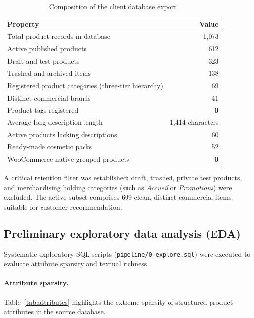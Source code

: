 \begin{table}[H]
\caption{Composition of the client database export}
\label{tab:catalogue}
\centering
\begin{tabularx}{\textwidth}{X r}
\toprule
\textbf{Property} & \textbf{Value} \\
\midrule
Total product records in database & 1{,}073 \\
Active published products & 612 \\
Draft and test products & 323 \\
Trashed and archived items & 138 \\
Registered product categories (three-tier hierarchy) & 69 \\
Distinct commercial brands & 41 \\
Product tags registered & \textbf{0} \\
Average long description length & 1{,}414 characters \\
Active products lacking descriptions & 60 \\
Ready-made cosmetic packs & 52 \\
WooCommerce native grouped products & \textbf{0} \\
\bottomrule
\end{tabularx}
\end{table}

A critical retention filter was established: draft, trashed, private test products, and merchandising holding categories (such as \emph{Accueil} or \emph{Promotions}) were excluded. The active subset comprises 609 clean, distinct commercial items suitable for customer recommendation.

\subsection{Preliminary exploratory data analysis (EDA)}

Systematic exploratory SQL scripts (\texttt{pipeline/0\_explore.sql}) were executed to evaluate attribute sparsity and textual richness.

\paragraph{Attribute sparsity.} Table~\ref{tab:attributes} highlights the extreme sparsity of structured product attributes in the source database.

